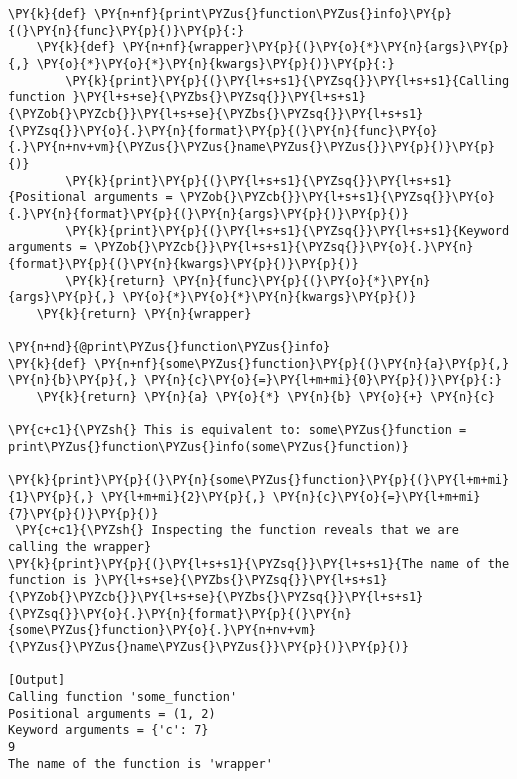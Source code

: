 \begin{Verbatim}[label=\makebox{\url{https://github.com/lucabaldini/cmepda/tree/master/slides/latex/snippets/decorator.py}},commandchars=\\\{\}]
\PY{k}{def} \PY{n+nf}{print\PYZus{}function\PYZus{}info}\PY{p}{(}\PY{n}{func}\PY{p}{)}\PY{p}{:}
    \PY{k}{def} \PY{n+nf}{wrapper}\PY{p}{(}\PY{o}{*}\PY{n}{args}\PY{p}{,} \PY{o}{*}\PY{o}{*}\PY{n}{kwargs}\PY{p}{)}\PY{p}{:}
        \PY{k}{print}\PY{p}{(}\PY{l+s+s1}{\PYZsq{}}\PY{l+s+s1}{Calling function }\PY{l+s+se}{\PYZbs{}\PYZsq{}}\PY{l+s+s1}{\PYZob{}\PYZcb{}}\PY{l+s+se}{\PYZbs{}\PYZsq{}}\PY{l+s+s1}{\PYZsq{}}\PY{o}{.}\PY{n}{format}\PY{p}{(}\PY{n}{func}\PY{o}{.}\PY{n+nv+vm}{\PYZus{}\PYZus{}name\PYZus{}\PYZus{}}\PY{p}{)}\PY{p}{)}
        \PY{k}{print}\PY{p}{(}\PY{l+s+s1}{\PYZsq{}}\PY{l+s+s1}{Positional arguments = \PYZob{}\PYZcb{}}\PY{l+s+s1}{\PYZsq{}}\PY{o}{.}\PY{n}{format}\PY{p}{(}\PY{n}{args}\PY{p}{)}\PY{p}{)}
        \PY{k}{print}\PY{p}{(}\PY{l+s+s1}{\PYZsq{}}\PY{l+s+s1}{Keyword arguments = \PYZob{}\PYZcb{}}\PY{l+s+s1}{\PYZsq{}}\PY{o}{.}\PY{n}{format}\PY{p}{(}\PY{n}{kwargs}\PY{p}{)}\PY{p}{)}
        \PY{k}{return} \PY{n}{func}\PY{p}{(}\PY{o}{*}\PY{n}{args}\PY{p}{,} \PY{o}{*}\PY{o}{*}\PY{n}{kwargs}\PY{p}{)}
    \PY{k}{return} \PY{n}{wrapper}

\PY{n+nd}{@print\PYZus{}function\PYZus{}info}
\PY{k}{def} \PY{n+nf}{some\PYZus{}function}\PY{p}{(}\PY{n}{a}\PY{p}{,} \PY{n}{b}\PY{p}{,} \PY{n}{c}\PY{o}{=}\PY{l+m+mi}{0}\PY{p}{)}\PY{p}{:}
    \PY{k}{return} \PY{n}{a} \PY{o}{*} \PY{n}{b} \PY{o}{+} \PY{n}{c}

\PY{c+c1}{\PYZsh{} This is equivalent to: some\PYZus{}function = print\PYZus{}function\PYZus{}info(some\PYZus{}function)}

\PY{k}{print}\PY{p}{(}\PY{n}{some\PYZus{}function}\PY{p}{(}\PY{l+m+mi}{1}\PY{p}{,} \PY{l+m+mi}{2}\PY{p}{,} \PY{n}{c}\PY{o}{=}\PY{l+m+mi}{7}\PY{p}{)}\PY{p}{)}
 \PY{c+c1}{\PYZsh{} Inspecting the function reveals that we are calling the wrapper}
\PY{k}{print}\PY{p}{(}\PY{l+s+s1}{\PYZsq{}}\PY{l+s+s1}{The name of the function is }\PY{l+s+se}{\PYZbs{}\PYZsq{}}\PY{l+s+s1}{\PYZob{}\PYZcb{}}\PY{l+s+se}{\PYZbs{}\PYZsq{}}\PY{l+s+s1}{\PYZsq{}}\PY{o}{.}\PY{n}{format}\PY{p}{(}\PY{n}{some\PYZus{}function}\PY{o}{.}\PY{n+nv+vm}{\PYZus{}\PYZus{}name\PYZus{}\PYZus{}}\PY{p}{)}\PY{p}{)}

[Output]
Calling function 'some_function'
Positional arguments = (1, 2)
Keyword arguments = {'c': 7}
9
The name of the function is 'wrapper'
\end{Verbatim}